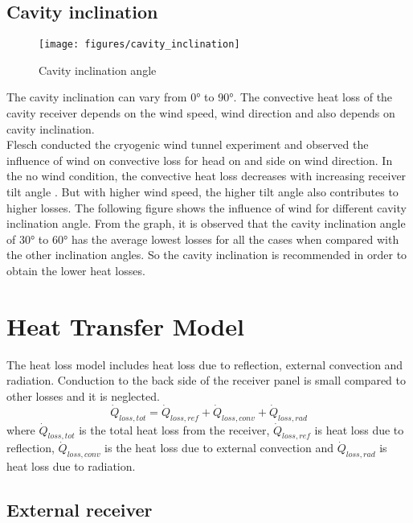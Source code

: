 \subsection{Cavity inclination}
\begin{figure}[h]
	\texttt{[image: figures/cavity\_inclination]}
	\centering
	\caption{Cavity inclination angle}	
\end{figure}
The cavity inclination can vary from 0° to 90°. The convective heat loss of the cavity receiver depends on the wind speed, wind direction and also depends on cavity inclination.\\
Flesch \cite{Flesch.2015} conducted the cryogenic wind tunnel experiment and observed the influence of wind on convective loss for head on and side on wind direction. In the no wind condition, the convective heat loss decreases with increasing receiver tilt angle\cite{Clausing.1981} \cite{Clausing.1983}. But with higher wind speed, the higher tilt angle also contributes to higher losses. The following figure shows the influence of wind for different cavity inclination angle. From the graph, it is observed that the cavity inclination angle of 30° to 60° has the average lowest losses for all the cases when compared with the other inclination angles. So the cavity inclination is recommended in order to obtain the lower heat losses. 
\section{Heat Transfer Model}

The heat loss model includes heat loss due to reflection, external convection and radiation. Conduction to the back side of the receiver panel is small compared to other losses and it is neglected.
\begin{equation}
\dot Q_{loss,tot} = \dot Q_{loss,ref}+ \dot Q_{loss,conv} + \dot Q_{loss,rad}
\end{equation}
where $\dot Q_{loss,tot}$ is the total heat loss from the receiver, $\dot Q_{loss,ref}$ is heat loss due to reflection, $\dot Q_{loss,conv}$ is the heat loss due to external convection and $\dot Q_{loss,rad}$ is heat loss due to radiation.
\subsection{External receiver}
